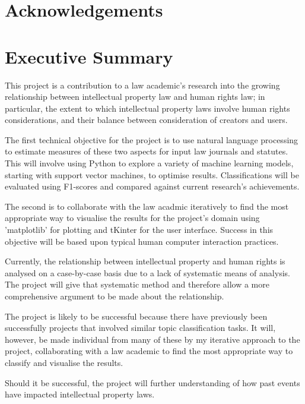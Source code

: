 \section*{Acknowledgements}
	\newpage
	
\section*{Executive Summary}	
	This project is a contribution to a law academic's research into the growing relationship between intellectual 	property law and human rights law; in particular, the extent to which intellectual property laws involve human rights considerations, and their balance between consideration of creators and users. 
	
	The first technical objective for the project is to use natural language processing to estimate measures of these two aspects for input law journals and statutes. This will involve using Python to explore a variety of machine learning models, starting with support vector machines, to optimise results. Classifications will be evaluated using F1-scores and compared against current research's achievements. 
	
	The second is to collaborate with the law acadmic iteratively to find the most appropriate way to visualise the results for the project's domain using 'matplotlib' for plotting and tKinter for the user interface. Success in this objective will be based upon typical human computer interaction practices.
	
	Currently, the relationship between intellectual property and human rights is analysed on a case-by-case basis due to a lack of systematic means of analysis. The project will give that systematic method and therefore allow a more comprehensive argument to be made about the relationship.  
	
	The project is likely to be successful because there have previously been successfully projects that involved similar topic classification tasks. It will, however, be made individual from many of these by my iterative approach to the project, collaborating with a law academic to find the most appropriate way to classify and visualise the results. 
	
	Should it be successful, the project will further understanding of how past events have impacted intellectual property laws. 

\tableofcontents